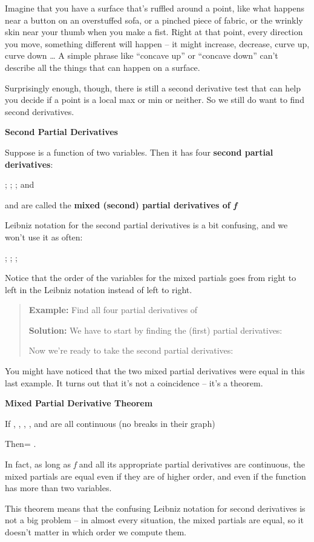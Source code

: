 Imagine that you have a surface that's ruffled around a point, like what
happens near a button on an overstuffed sofa, or a pinched piece of
fabric, or the wrinkly skin near your thumb when you make a fist. Right
at that point, every direction you move, something different will happen
-- it might increase, decrease, curve up, curve down \ldots{} A simple
phrase like ``concave up'' or ``concave down'' can't describe all the
things that can happen on a surface.

Surprisingly enough, though, there is still a second derivative test
that can help you decide if a point is a local max or min or neither. So
we still do want to find second derivatives.

\textbf{Second Partial Derivatives }

Suppose is a function of two variables. Then it has four \textbf{second
partial derivatives}:

; ; ; and

and are called the \textbf{mixed (second) partial derivatives of
\emph{f}}

Leibniz notation for the second partial derivatives is a bit confusing,
and we won't use it as often:

; ; ;

Notice that the order of the variables for the mixed partials goes from
right to left in the Leibniz notation instead of left to right.

\begin{quote}
\textbf{Example:} Find all four partial derivatives of

\textbf{Solution:} We have to start by finding the (first) partial
derivatives:

Now we're ready to take the second partial derivatives:
\end{quote}

You might have noticed that the two mixed partial derivatives were equal
in this last example. It turns out that it's not a coincidence -- it's a
theorem.

\textbf{Mixed Partial Derivative Theorem }

If , , , , and are all continuous (no breaks in their graph)

Then= .

In fact, as long as \emph{f} and all its appropriate partial derivatives
are continuous, the mixed partials are equal even if they are of higher
order, and even if the function has more than two variables.

This theorem means that the confusing Leibniz notation for second
derivatives is not a big problem -- in almost every situation, the mixed
partials are equal, so it doesn't matter in which order we compute them.

